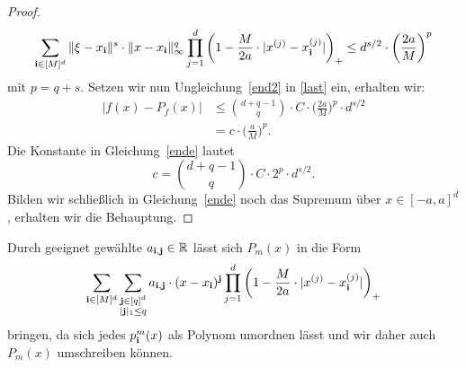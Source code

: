 \begin{proof}
\begin{equation}
 \label{end2}   
\sum_{\mathbf{i} \in [M]^d} \|\xi - x_{\mathbf{i}} \|^s \cdot \|x - x_{\mathbf{i}}\|_{\infty}^q \prod_{j = 1}^d \bigg(1 - \frac{M}{2a} \cdot |x^{(j)} - x_{\mathbf{i}}^{(j)}|\bigg)_+ \leq d^{s/2} \cdot \bigg(\frac{2a}{M}\bigg)^p
\end{equation} 
mit $p = q + s.$ Setzen wir nun Ungleichung~\eqref{end2} in \eqref{last} ein, erhalten wir:
\begin{equation}
\label{ende}
\begin{split}
|f(x) - P_f(x)| &\leq \binom{d + q - 1}{q} \cdot C \cdot \bigg(\frac{2a}{M}\bigg)^p \cdot d^{s/2}\\
& = c \cdot \bigg(\frac{a}{M}\bigg)^p.
\end{split}
\end{equation}
Die Konstante in Gleichung~\eqref{ende} lautet
$$c = \binom{d + q - 1}{q} \cdot C \cdot 2^p \cdot d^{s/2}.$$
Bilden wir schließlich in Gleichung~\eqref{ende} noch das Supremum über $x \in [-a, a]^d$, erhalten wir die Behauptung.
\end{proof}

Durch geeignet gewählte $a_{\mathbf{i}, \mathbf{j}} \in \mathbb{R}$ lässt sich $P_m(x)$ in die Form 
$$\sum_{\mathbf{i} \in [M]^d} \sum_{\substack{ \mathbf{j} \in [q]^d\\|\mathbf{j}|_1 \leq q}} a_{\mathbf{i}, \mathbf{j}} \cdot (x - x_{\mathbf{i}})^{\mathbf{j}} \prod_{j = 1}^d \bigg(1 - \frac{M}{2a} \cdot |x^{(j)} - x_{\mathbf{i}}^{(j)}|\bigg)_+$$
bringen, da sich jedes $p^m_{\mathbf{i}}(x)$ als Polynom umordnen lässt und wir daher auch $P_m(x)$ umschreiben können.

